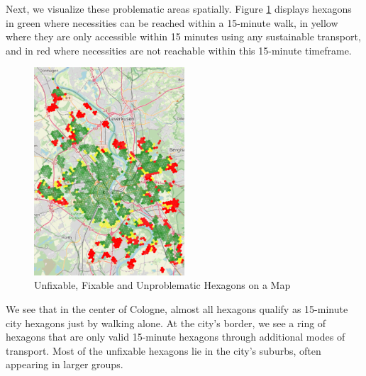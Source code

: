 Next, we visualize these problematic areas spatially.
Figure \ref{fig:problematic_hexagons} displays hexagons in green where necessities can be reached within a 15-minute walk, in yellow where they are only accessible within 15 minutes using any sustainable transport, and in red where necessities are not reachable within this 15-minute timeframe.
\begin{figure}
  \begin{center}
    \includegraphics[width=0.50\textwidth]{Figures/results/problematic_hexagons/problematic_hexagons}
  \end{center}
  \caption{Unfixable, Fixable and Unproblematic Hexagons on a Map}
  \label{fig:problematic_hexagons}
\end{figure}
We see that in the center of Cologne, almost all hexagons qualify as 15-minute city hexagons just by walking alone.
At the city's border, we see a ring of hexagons that are only valid 15-minute hexagons through additional modes of transport.
Most of the unfixable hexagons lie in the city's suburbs, often appearing in larger groups.

